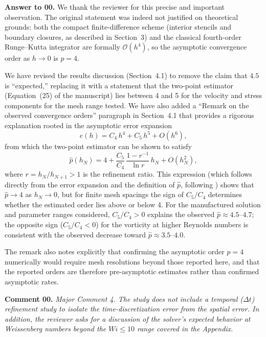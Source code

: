 \documentclass[12pt]{article}
\newcounter{question}
\newcommand{\name}{00}
\newcommand{\question}[1]{\stepcounter{question} \noindent \textbf{Comment \name.\thequestion} \emph{#1} }
\newcommand{\answer}[1]{\noindent \textbf{Answer to \name.\thequestion} #1 \mbox{}\\}
\begin{document}
\answer{We thank the reviewer for this precise and important observation. The original statement was indeed not justified on theoretical grounds: both the compact finite-difference scheme (interior stencils and boundary closures, as described in Section~3) and the classical fourth-order Runge--Kutta integrator are formally $\mathcal{O}(h^4)$, so the asymptotic convergence order as $h\to0$ is $p=4$.

We have revised the results discussion (Section~4.1) to remove the claim that $4.5$ is ``expected,'' replacing it with a statement that the two-point estimator (Equation~(25) of the manuscript) lies between 4 and 5 for the velocity and stress components for the mesh range tested. We have also added a ``Remark on the observed convergence orders'' paragraph in Section~4.1 that provides a rigorous explanation rooted in the asymptotic error expansion
\[
  e(h) = C_4\,h^4 + C_5\,h^5 + O(h^6),
\]
from which the two-point estimator can be shown to satisfy
\[
  \widehat{p}(h_N) = 4 + \frac{C_5}{C_4}\,\frac{1-r^{-1}}{\ln r}\,h_N + O(h_N^2),
\]
where $r = h_N/h_{N+1} > 1$ is the refinement ratio. This expression (which follows directly from the error expansion and the definition of $\widehat{p}$, following \citet{leveque2007finite}) shows that $\widehat{p}\to4$ as $h_N\to0$, but for finite mesh spacings the sign of $C_5/C_4$ determines whether the estimated order lies above or below 4. For the manufactured solution and parameter ranges considered, $C_5/C_4 > 0$ explains the observed $\widehat{p}\approx4.5$--$4.7$; the opposite sign ($C_5/C_4 < 0$) for the vorticity at higher Reynolds numbers is consistent with the observed decrease toward $\widehat{p}\approx3.5$--$4.0$.

The remark also notes explicitly that confirming the asymptotic order $p=4$ numerically would require mesh resolutions beyond those reported here, and that the reported orders are therefore pre-asymptotic estimates rather than confirmed asymptotic rates.}

\vspace{3mm}

\question{Major Comment 4. The study does not include a temporal ($\Delta t$) refinement study to isolate the time-discretization error from the spatial error. In addition, the reviewer asks for a discussion of the solver's expected behavior at Weissenberg numbers beyond the $Wi \leq 10$ range covered in the Appendix.}
\end{document}
